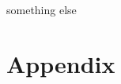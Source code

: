 \documentclass{article}
\begin{document}
\begin{titlepage}
    
\end{titlepage}

\tableofcontents










something else\cite{something}

\printbibliography[title={Bibliografia}]

\section*{Appendix}
\end{document}
